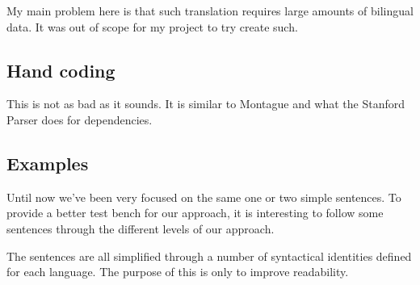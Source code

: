 \documentclass[12pt]{article}
\begin{document}
My main problem here is that such translation requires large amounts of bilingual data. It was out of scope for my project to try create such.

\subsection{Hand coding}
This is not as bad as it sounds. It is similar to Montague and what the Stanford Parser does for dependencies.

\subsection{Examples}
Until now we've been very focused on the same one or two simple sentences. To provide a better test bench for our approach, it is interesting to follow some sentences through the different levels of our approach.

The sentences are all simplified through a number of syntactical identities defined for each language. The purpose of this is only to improve readability.
\end{document}
